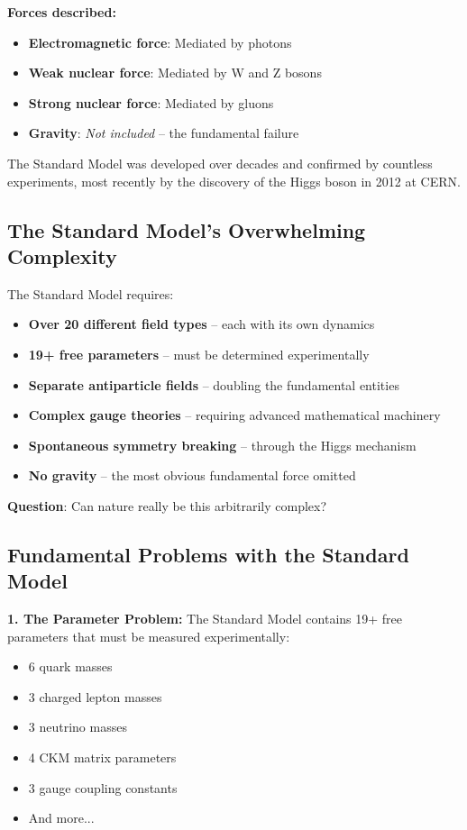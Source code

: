 	\textbf{Forces described:}
	\begin{itemize}
		\item \textbf{Electromagnetic force}: Mediated by photons
		\item \textbf{Weak nuclear force}: Mediated by W and Z bosons
		\item \textbf{Strong nuclear force}: Mediated by gluons
		\item \textbf{Gravity}: \emph{Not included} -- the fundamental failure
	\end{itemize}
	
	The Standard Model was developed over decades and confirmed by countless experiments, most recently by the discovery of the Higgs boson in 2012 at CERN.
	
	\subsection{The Standard Model's Overwhelming Complexity}
	
	\begin{tcolorbox}[colback=red!5!white,colframe=red!75!black,title=Standard Model Complexity Crisis]
		The Standard Model requires:
		\begin{itemize}
			\item \textbf{Over 20 different field types} -- each with its own dynamics
			\item \textbf{19+ free parameters} -- must be determined experimentally
			\item \textbf{Separate antiparticle fields} -- doubling the fundamental entities
			\item \textbf{Complex gauge theories} -- requiring advanced mathematical machinery
			\item \textbf{Spontaneous symmetry breaking} -- through the Higgs mechanism
			\item \textbf{No gravity} -- the most obvious fundamental force omitted
		\end{itemize}
		
		\textbf{Question}: Can nature really be this arbitrarily complex?
	\end{tcolorbox}
	
	\subsection{Fundamental Problems with the Standard Model}
	
	\textbf{1. The Parameter Problem:}
	The Standard Model contains 19+ free parameters that must be measured experimentally:
	\begin{itemize}
		\item 6 quark masses
		\item 3 charged lepton masses  
		\item 3 neutrino masses
		\item 4 CKM matrix parameters
		\item 3 gauge coupling constants
		\item And more...
	\end{itemize}
	
